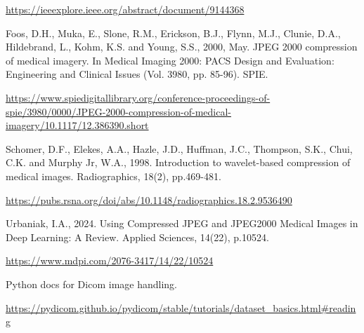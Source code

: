 \documentclass[conference,letterpaper]{IEEEtran}
\begin{document}
\begin{thebibliography}{00}
\href{https://ieeexplore.ieee.org/abstract/document/9144368}{https://ieeexplore.ieee.org/abstract/document/9144368}

Foos, D.H., Muka, E., Slone, R.M., Erickson, B.J., Flynn, M.J., Clunie, D.A., Hildebrand, L., Kohm, K.S. and Young, S.S., 2000, May. JPEG 2000 compression of medical imagery. In Medical Imaging 2000: PACS Design and Evaluation: Engineering and Clinical Issues (Vol. 3980, pp. 85-96). SPIE.

\href{https://www.spiedigitallibrary.org/conference-proceedings-of-spie/3980/0000/JPEG-2000-compression-of-medical-imagery/10.1117/12.386390.short}{https://www.spiedigitallibrary.org/conference-proceedings-of-spie/3980/0000/JPEG-2000-compression-of-medical-imagery/10.1117/12.386390.short}

Schomer, D.F., Elekes, A.A., Hazle, J.D., Huffman, J.C., Thompson, S.K., Chui, C.K. and Murphy Jr, W.A., 1998. Introduction to wavelet-based compression of medical images. Radiographics, 18(2), pp.469-481.

\href{https://pubs.rsna.org/doi/abs/10.1148/radiographics.18.2.9536490}{https://pubs.rsna.org/doi/abs/10.1148/radiographics.18.2.9536490}

Urbaniak, I.A., 2024. Using Compressed JPEG and JPEG2000 Medical Images in Deep Learning: A Review. Applied Sciences, 14(22), p.10524.

\href{https://www.mdpi.com/2076-3417/14/22/10524}{https://www.mdpi.com/2076-3417/14/22/10524}

 Python docs for Dicom image handling.

\href{https://www.mdpi.com/2076-3417/14/22/10524}{https://pydicom.github.io/pydicom/stable/tutorials/dataset_basics.html#reading}

\end{thebibliography}
\end{document}
